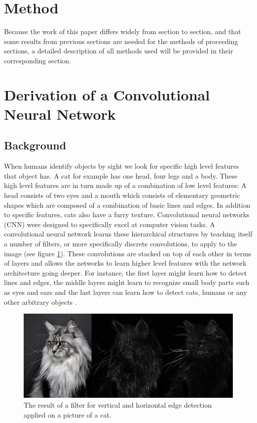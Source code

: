 \documentclass[a4paper, twoside]{article}
\begin{document}
\section{Method}

Because the work of this paper differs widely from section to section, and that some results from previous sections are needed for the methods of proceeding sections, a detailed description of all methods used will be provided in their corresponding section.

\section{Derivation of a Convolutional Neural Network}
\subsection{Background}
When humans identify objects by sight we look for specific high level features that object has. A cat for example has one head, four legs and a body. These high level features are in turn made up of a combination of low level features: A head consists of two eyes and a mouth which consists of elementary geometric shapes which are composed of a combination of basic lines and edges. In addition to specific features, cats also have a furry texture. Convolutional neural networks (CNN) were designed to specifically excel at computer vision tasks. A convolutional neural network learns these hierarchical structures by teaching itself a number of filters, or more specifically discrete convolutions, to apply to the image (see figure \ref{figkatter}). These convolutions are stacked on top of each other in terms of layers and allows the networks to learn higher level features with the network architecture going deeper. For instance, the first layer might learn how to detect lines and edges, the middle layers might learn to recognize small body parts such as eyes and ears and the last layers can learn how to detect cats, humans or any other arbitrary objects \cite{cs231n}.

\begin{figure}[h]
	\centering
  		\includegraphics[scale=0.33]{katter.png}
  	\caption{The result of a filter for vertical and horizontal edge detection applied on a picture of a cat.} \label{figkatter}
\end{figure}
\end{document}
